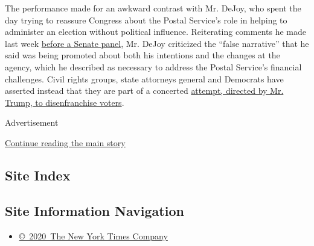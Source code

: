 The performance made for an awkward contrast with Mr. DeJoy, who spent
the day trying to reassure Congress about the Postal Service's role in
helping to administer an election without political influence.
Reiterating comments he made last week
\href{https://www.nytimes3xbfgragh.onion/2020/08/21/us/politics/dejoy-postal-service-senate-hearing.html}{before
a Senate panel}, Mr. DeJoy criticized the ``false narrative'' that he
said was being promoted about both his intentions and the changes at the
agency, which he described as necessary to address the Postal Service's
financial challenges. Civil rights groups, state attorneys general and
Democrats have asserted instead that they are part of a concerted
\href{https://www.nytimes3xbfgragh.onion/live/2020/08/24/us/rnc-convention-election/democrats-are-using-covid-to-steal-the-election-trump-says-in-an-inflammatory-rnc-speech}{attempt,
directed by Mr. Trump, to disenfranchise voters}.

Advertisement

\protect\hyperlink{after-bottom}{Continue reading the main story}

\hypertarget{site-index}{%
\subsection{Site Index}\label{site-index}}

\hypertarget{site-information-navigation}{%
\subsection{Site Information
Navigation}\label{site-information-navigation}}

\begin{itemize}
\tightlist
\item
  \href{https://help.nytimes3xbfgragh.onion/hc/en-us/articles/115014792127-Copyright-notice}{©~2020~The
  New York Times Company}
\end{itemize}

